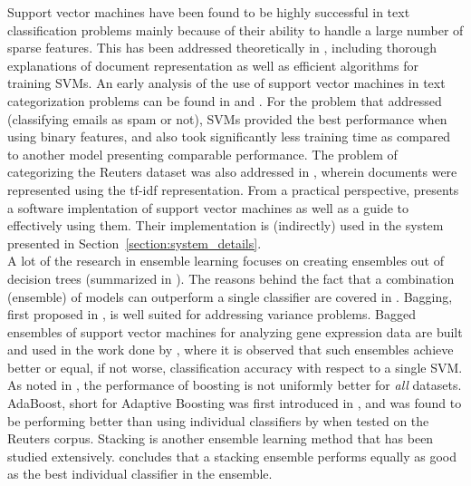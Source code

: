 Support vector machines have been found to be highly successful in text classification problems mainly because of their ability to handle a large number of sparse features. This has been addressed theoretically in \cite{joachims2002learning}, including thorough explanations of document representation as well as efficient algorithms for training SVMs. An early analysis of the use of support vector machines in text categorization problems can be found in \cite{joachims1998text} and \cite{drucker1999support}. For the problem that \cite{drucker1999support} addressed (classifying emails as spam or not), SVMs provided the best performance when using binary features, and also took significantly less training time as compared to another model presenting comparable performance. The problem of categorizing the Reuters \cite{reuters} dataset was also addressed in \cite{manevitz2002one}, wherein documents were represented using the tf-idf representation. From a practical perspective, \cite{hsu2003practical} presents a software implentation of support vector machines as well as a guide to effectively using them. Their implementation is (indirectly) used in the system presented in Section~\ref{section:system_details}.\\

A lot of the research in ensemble learning focuses on creating ensembles out of decision trees (summarized in \cite{safavian1991survey}). The reasons behind the fact that a combination (ensemble) of models can outperform a single classifier are covered in \cite{valentini2002ensembles}. Bagging, first proposed in \cite{breiman1996bagging}, is well suited for addressing variance problems. Bagged ensembles of support vector machines for analyzing gene expression data are built and used in the work done by \cite{valentini2003bagged}, where it is observed that such ensembles achieve better or equal, if not worse, classification accuracy with respect to a single SVM. As noted in \cite{bauer1999empirical}, the performance of boosting is not uniformly better for \emph{all} datasets. AdaBoost, short for Adaptive Boosting was first introduced in \cite{freund1999short}, and was found to be performing better than using individual classifiers by \cite{bloehdorn2004text} when tested on the Reuters \cite{reuters} corpus. Stacking \cite{wolpert1992stacked} is another ensemble learning method that has been studied extensively. \cite{dvzeroski2004combining} concludes that a stacking ensemble performs equally as good as the best individual classifier in the ensemble.\\

